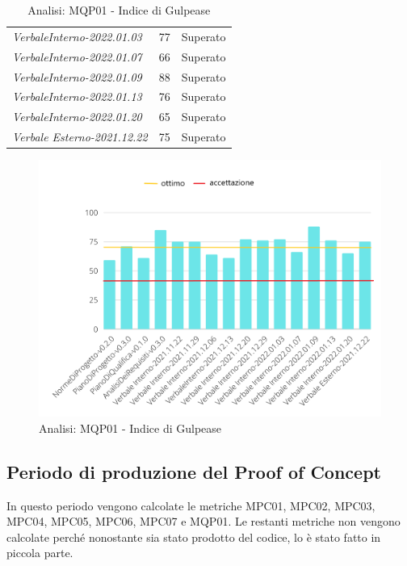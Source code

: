 \begin{table}[H]
\begin{tabular}{m{}<{\centering}  m{}<{\centering}  m{}<{\centering} }
            \textit{VerbaleInterno-2022.01.03}&
            77 &
            Superato \\
            
            \textit{VerbaleInterno-2022.01.07}&
            66 &
            Superato \\
            
            \textit{VerbaleInterno-2022.01.09}&
            88 &
            Superato \\
            
            \textit{VerbaleInterno-2022.01.13}&
            76 &
            Superato \\
            
            \textit{VerbaleInterno-2022.01.20}&
            65 &
            Superato \\

            \textit{Verbale Esterno-2021.12.22}&
            75&
            Superato \\
            
    
    \end{tabular}
    \caption{Analisi: MQP01 - Indice di Gulpease}

	\begin{figure}[H]
        \centering
        \includegraphics[scale=0.50]{Sezioni/images/analisi-gulpease.png}
        \caption{Analisi: MQP01 - Indice di Gulpease}
    \end{figure}
\end{table}

\subsection{Periodo di produzione del Proof of Concept}
In questo periodo vengono calcolate le metriche MPC01, MPC02, MPC03, MPC04, MPC05, MPC06, MPC07 e MQP01. Le restanti metriche non vengono calcolate perché nonostante sia stato prodotto del codice, lo è stato fatto in piccola parte.
